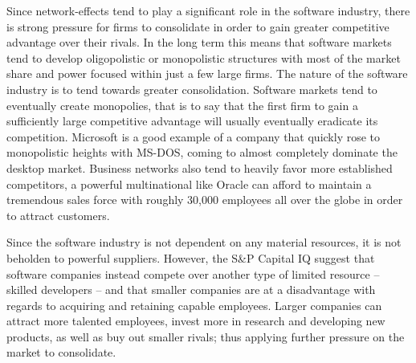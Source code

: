 Since network-effects tend to play a significant role in the software industry, there is strong pressure for firms to consolidate in order to gain greater competitive advantage over their rivals.\autocite[422]{schief2013mergers}
In the long term this means that software markets tend to develop oligopolistic or monopolistic structures with most of the market share and power focused within just a few large firms.\autocite[422]{schief2013mergers}
The nature of the software industry is to tend towards greater consolidation.\autocite[]{LargeParadigmShiftCloudComputing}
Software markets tend to eventually create monopolies, that is to say that the first firm to gain a sufficiently large competitive advantage will usually eventually eradicate its competition.\autocite[4]{buxmann2012software}
Microsoft is a good example of a company that quickly rose to monopolistic heights with MS-DOS, coming to almost completely dominate the desktop market.\autocite[4]{buxmann2012software}
Business networks also tend to heavily favor more established competitors, a powerful multinational like Oracle can afford to maintain a tremendous sales force with roughly 30,000 employees all over the globe in order to attract customers.\autocite[]{OracleCloudNotAWS}

Since the software industry is not dependent on any material resources, it is not beholden to powerful suppliers.
However, the S\&P Capital IQ suggest that software companies instead compete over another type of limited resource -- skilled developers -- and that smaller companies are at a disadvantage with regards to acquiring and retaining capable employees.\autocite[39]{SurveysSoftware2015}
Larger companies can attract more talented employees, invest more in research and developing new products, as well as buy out smaller rivals; thus applying further pressure on the market to consolidate.\autocite[34]{IndustrySurveysInternet}

